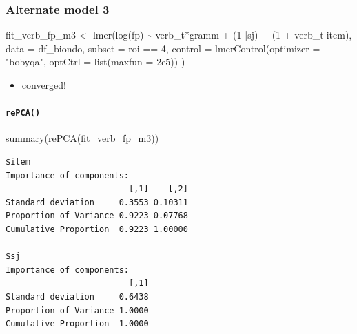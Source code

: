 \documentclass[
  letterpaper,
  DIV=11,
  numbers=noendperiod]{scrartcl}
\let\oldparagraph\paragraph
\renewcommand{\paragraph}[1]{\oldparagraph{#1}\mbox{}}
\newenvironment{Shaded}{\begin{snugshade}}{\end{snugshade}}
\newcommand{\AttributeTok}[1]{\textcolor[rgb]{0.40,0.45,0.13}{#1}}
\newcommand{\DecValTok}[1]{\textcolor[rgb]{0.68,0.00,0.00}{#1}}
\newcommand{\FloatTok}[1]{\textcolor[rgb]{0.68,0.00,0.00}{#1}}
\newcommand{\FunctionTok}[1]{\textcolor[rgb]{0.28,0.35,0.67}{#1}}
\newcommand{\NormalTok}[1]{\textcolor[rgb]{0.00,0.23,0.31}{#1}}
\newcommand{\OtherTok}[1]{\textcolor[rgb]{0.00,0.23,0.31}{#1}}
\newcommand{\SpecialCharTok}[1]{\textcolor[rgb]{0.37,0.37,0.37}{#1}}
\newcommand{\StringTok}[1]{\textcolor[rgb]{0.13,0.47,0.30}{#1}}
\providecommand{\tightlist}{%
  \setlength{\itemsep}{0pt}\setlength{\parskip}{0pt}}\usepackage{longtable,booktabs,array}
\begin{document}
\hypertarget{alternate-model-3}{%
\subsubsection{Alternate model 3}\label{alternate-model-3}}

\begin{Shaded}
\begin{Highlighting}[]
\NormalTok{fit\_verb\_fp\_m3 }\OtherTok{\textless{}{-}} \FunctionTok{lmer}\NormalTok{(}\FunctionTok{log}\NormalTok{(fp) }\SpecialCharTok{\textasciitilde{}}\NormalTok{ verb\_t}\SpecialCharTok{*}\NormalTok{gramm }\SpecialCharTok{+} 
\NormalTok{                      (}\DecValTok{1} \SpecialCharTok{|}\NormalTok{sj) }\SpecialCharTok{+}
\NormalTok{                      (}\DecValTok{1} \SpecialCharTok{+}\NormalTok{ verb\_t}\SpecialCharTok{|}\NormalTok{item),}
                    \AttributeTok{data =}\NormalTok{ df\_biondo,}
                    \AttributeTok{subset =}\NormalTok{ roi }\SpecialCharTok{==} \DecValTok{4}\NormalTok{,}
                    \AttributeTok{control =} \FunctionTok{lmerControl}\NormalTok{(}\AttributeTok{optimizer =} \StringTok{"bobyqa"}\NormalTok{,}
                                          \AttributeTok{optCtrl =} \FunctionTok{list}\NormalTok{(}\AttributeTok{maxfun =} \FloatTok{2e5}\NormalTok{))}
\NormalTok{)}
\end{Highlighting}
\end{Shaded}

\begin{itemize}
\tightlist
\item
  converged!
\end{itemize}

\hypertarget{repca-2}{%
\paragraph{\texorpdfstring{\texttt{rePCA()}}{rePCA()}}\label{repca-2}}

\begin{Shaded}
\begin{Highlighting}[]
\FunctionTok{summary}\NormalTok{(}\FunctionTok{rePCA}\NormalTok{(fit\_verb\_fp\_m3))}
\end{Highlighting}
\end{Shaded}

\begin{verbatim}
$item
Importance of components:
                         [,1]    [,2]
Standard deviation     0.3553 0.10311
Proportion of Variance 0.9223 0.07768
Cumulative Proportion  0.9223 1.00000

$sj
Importance of components:
                         [,1]
Standard deviation     0.6438
Proportion of Variance 1.0000
Cumulative Proportion  1.0000
\end{verbatim}
\end{document}
